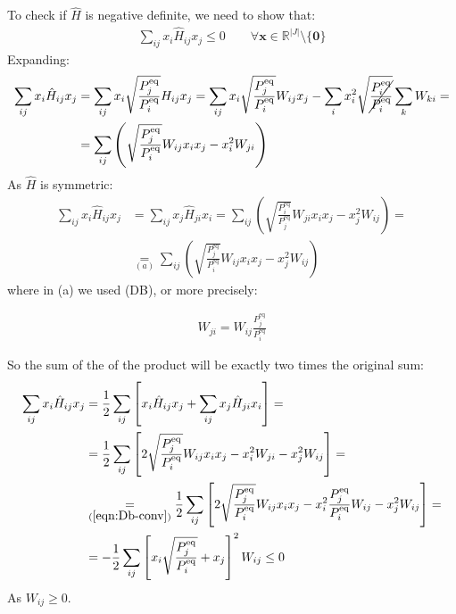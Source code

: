 \documentclass[../template.tex]{subfiles}
\begin{document}
\begin{exo}
\begin{enumerate}
        To check if $\hat{H}$ is negative definite, we need to show that:
        \begin{align*}
            \sum_{ij} x_i \hat{H}_{ij} x_j \leq 0 \qquad \forall \bm{x} \in \mathbb{R}^{|J|} \setminus \{\bm{0}\} 
        \end{align*}
        Expanding:
        \begin{align*}
            \sum_{ij} x_i \hat{H}_{ij} x_j &= \sum_{ij} x_i \sqrt{\frac{P_j^{\mathrm{eq} }}{P_i^{\mathrm{eq} }} } H_{ij} x_j = \sum_{ij} x_i \sqrt{\frac{P_j^{\mathrm{eq} }}{P_i^{\mathrm{eq} }} } W_{ij} x_j - \sum_{i} x_i^2  \sqrt{\cancel{\frac{P_i^{\mathrm{eq} }}{P_i^{\mathrm{eq} }}} } \sum_k W_{ki} =\\
            &= \sum_{ij} \left( \sqrt{\frac{P_j^{\mathrm{eq} }}{P_i^{\mathrm{eq} }} } W_{ij} x_i x_j - x_i^2 W_{ji}\right)
        \end{align*}
        As $\hat{H}$ is symmetric:
        \begin{align*}
            \sum_{ij} x_i \hat{H}_{ij} x_j &= \sum_{ij} x_j \hat{H}_{ji} x_i = \sum_{ij} \left( \sqrt{\frac{P_i^{\mathrm{eq} }}{P_j^{\mathrm{eq} }} } W_{ji} x_i x_j - x_j^2 W_{ij}\right) =\\
            & \underset{(a)}{=} \sum_{ij} \left( \sqrt{\frac{P_j^{\mathrm{eq} }}{P_i^{\mathrm{eq} }} } W_{ij} x_i x_j -  x_j^2 W_{ij}\right)
        \end{align*}
        where in (a) we used (DB), or more precisely:
        
        \begin{align}
            \label{eqn:Db-conv}
            W_{ji} = W_{ij} \frac{P_j^{\mathrm{eq}}}{P_i^{\mathrm{eq} }}
        \end{align}

        So the sum of the  of the product will be exactly two times the original sum:
        \begin{align*}
            \sum_{ij} x_i \hat{H}_{ij} x_j &= \frac{1}{2} \sum_{ij} \left[x_i \hat{H}_{ij} x_j +  \sum_{ij} x_j \hat{H}_{ji} x_i \right] =\\
            &= \frac{1}{2} \sum_{ij} \left[2 \sqrt{\frac{P_j^{\mathrm{eq} }}{P_i^{\mathrm{eq} }} } W_{ij} x_i x_j - x_i^2 W_{ji} - x_j^2 W_{ij}\right] =\\
            &\underset{(\ref{eqn:Db-conv})}{=} \frac{1}{2} \sum_{ij} \left[ 2 \sqrt{\frac{P_j^{\mathrm{eq} }}{P_i^{\mathrm{eq} }} } W_{ij} x_i x_j - x_i^2 \frac{P_j^{\mathrm{eq}}}{P_i^{\mathrm{eq} }} W_{ij} - x_j^2 W_{ij} \right] =\\
            &= -\frac{1}{2} \sum_{ij} \left [x_i \sqrt{\frac{P_j^{\mathrm{eq}}}{P_i^{\mathrm{eq} }}} + x_j \right ]^2 W_{ij} \leq 0
        \end{align*}
        As $W_{ij} \geq 0$. \\



\end{enumerate}
\end{exo}
\end{document}
